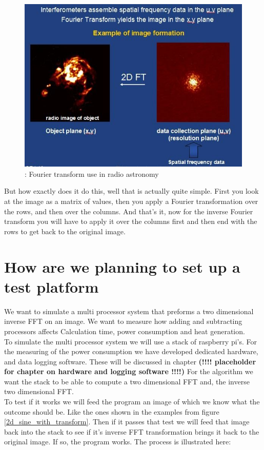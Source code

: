 \documentclass[11pt, A4, oneside]{article}
\begin{document}
\begin{figure}[!ht]
	\centering
	\includegraphics[width=\linewidth]{example_fft}
	\caption{: Fourier transform use in radio astronomy}
	\label{FFT use in radio astronomy}
\end{figure} 

But how exactly does it do this, well that is actually quite simple. First you look at the image as a matrix of values, then you apply a Fourier transformation over the rows, and then over the columns. And that's it, now for the inverse Fourier transform you will have to apply it over the columns first and then end with the rows to get back to the original image.     

\section{How are we planning to set up a test platform}

We want to simulate a multi processor system that preforms a two dimensional inverse FFT on an image. We want to measure how adding and subtracting processors affects Calculation time, power consumption and heat generation.\\To simulate the multi processor system we will use a stack of raspberry pi's. For the measuring of the power consumption we have developed dedicated hardware, and data logging software. These will be discussed in chapter \textbf{(!!!! placeholder for chapter on hardware and logging software !!!!)} 
For the algorithm we want the stack to be able to compute a two dimensional FFT and, the inverse two dimensional FFT.\\ To test if it works we will feed the program an image of which we know what the outcome should be. Like the ones shown in the examples from figure \ref{2d_sine_with_transform}. Then if it passes that test we will feed that image back into the stack to see if it's inverse FFT transformation brings it back to the original image. If so, the program works. The process is illustrated here: 
\end{document}
